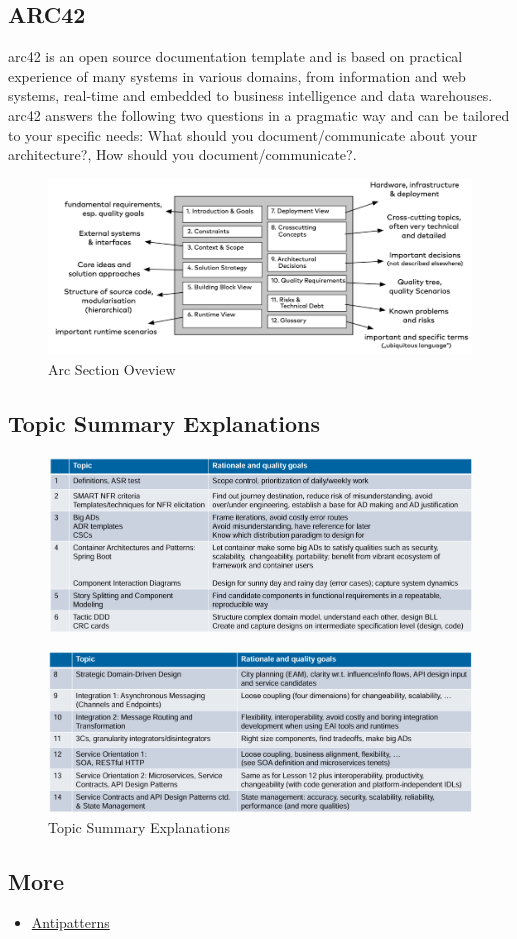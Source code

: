 \documentclass[../Main.tex]{subfiles}
\begin{document}
\newpage
\subsection{ARC42}
arc42 is an open source documentation template and is based on practical experience of many systems in various
domains, from information and web systems, real-time and embedded to business intelligence and data warehouses.
arc42 answers the following two questions in a pragmatic way and can be tailored to your specific needs: What should
you document/communicate about your architecture?, How should you document/communicate?.

\begin{figure}[H]
    \centering
    \includegraphics[width=0.75\linewidth]{Images/arc-section-overview.png}
    \caption{Arc Section Oveview}
\end{figure}
\newpage

\subsection{Topic Summary Explanations}
\begin{figure}[H]
    \centering
    \includegraphics[width=1\linewidth]{Images/topic-summary-explanation.png}
\end{figure}
\begin{figure}[H]
    \centering
    \includegraphics[width=1\linewidth]{Images/topic-summary-explanation-1.png}
    \caption{Topic Summary Explanations}
\end{figure}

\subsection{More}
\begin{itemize}
    \item \href{https://architecture-antipatterns.tech/}{Antipatterns}
\end{itemize}
\end{document}
